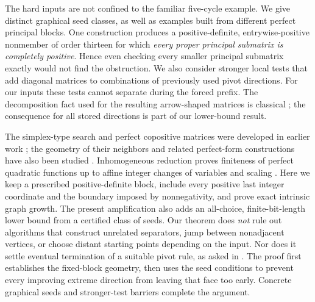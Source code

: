 The hard inputs are not confined to the familiar five-cycle example. We give distinct graphical seed classes, as well as examples built from different perfect principal blocks. One construction produces a positive-definite, entrywise-positive nonmember of order thirteen for which \emph{every proper principal submatrix is completely positive}. Hence even checking every smaller principal submatrix exactly would not find the obstruction. We also consider stronger local tests that add diagonal matrices to combinations of previously used pivot directions. For our inputs these tests cannot separate during the forced prefix. The decomposition fact used for the resulting arrow-shaped matrices is classical \cite{SPN}; the consequence for all stored directions is part of our lower-bound result.

The simplex-type search and perfect copositive matrices were developed in earlier work \cite{DSV}; the geometry of their neighbors and related perfect-form constructions have also been studied \cite{DS,OS}. Inhomogeneous reduction proves finiteness of perfect quadratic functions up to affine integer changes of variables and scaling \cite[Section~5]{Inhom}. Here we keep a prescribed positive-definite block, include every positive last integer coordinate and the boundary imposed by nonnegativity, and prove exact intrinsic graph growth. The present amplification also adds an all-choice, finite-bit-length lower bound from a certified class of seeds. Our theorem does \emph{not} rule out algorithms that construct unrelated separators, jump between nonadjacent vertices, or choose distant starting points depending on the input. Nor does it settle eventual termination of a suitable pivot rule, as asked in \cite[Conjecture~3.2]{DSV}. The proof first establishes the fixed-block geometry, then uses the seed conditions to prevent every improving extreme direction from leaving that face too early. Concrete graphical seeds and stronger-test barriers complete the argument.
